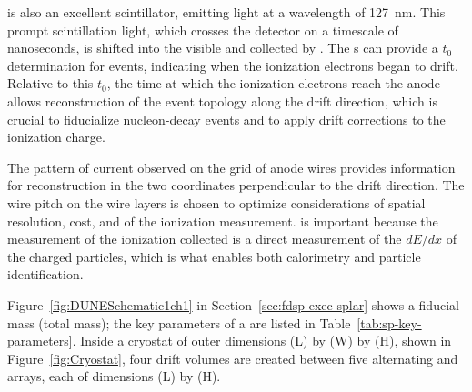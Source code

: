 
 is also an excellent scintillator, emitting  light at a wavelength of \SI{127}{\nano\meter}. This prompt scintillation light, which crosses the detector on a timescale of nanoseconds, is shifted into the visible and collected by . The s can provide a $t_{0}$ determination for events, indicating when the ionization electrons began to drift. Relative to this $t_{0}$, the time at which the ionization electrons reach the anode allows reconstruction of the event topology along the drift direction, which is crucial to fiducialize nucleon-decay events and to apply drift corrections to the ionization charge.

The pattern of current observed on the grid of anode wires provides information for reconstruction in the two coordinates perpendicular to the drift direction. The wire pitch on the wire layers is chosen to optimize considerations of  spatial resolution, cost, and  of the ionization measurement.  is important because the measurement of the ionization collected is a direct measurement of the $dE/dx$ of the charged particles, which is what enables both calorimetry and particle identification.

Figure~\ref{fig:DUNESchematic1ch1} in Section~\ref{sec:fdsp-exec-splar} shows a \nominalmodsize fiducial mass  (\larmass total mass); the key parameters of a  are listed in Table~\ref{tab:sp-key-parameters}. Inside a cryostat of outer dimensions \cryostatlen (L) by \cryostatwdth (W) by \cryostatht{} (H), shown in Figure~\ref{fig:Cryostat}, four \spmaxdrift drift volumes are created between five alternating  and  arrays, each of dimensions \sptpclen (L) by \tpcheight (H).



